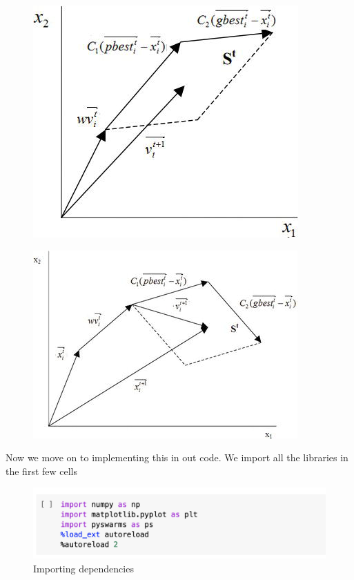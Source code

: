 \documentclass[12pt]{article}
\newcommand{\nd}{\noindent}
\begin{document}
\hspace{-5mm}
\begin{figure}[h]
\centering
\begin{minipage}{.5\textwidth}
  \centering
  \includegraphics[width=0.7\linewidth]{ps1.png}
  \label{fig:test1}
\end{minipage}%
\begin{minipage}{.5\textwidth}
  \centering
  \includegraphics[width=0.87\linewidth]{ps2.png}
  \label{fig:test2}
\end{minipage}
\end{figure}

\nd Now we move on to implementing this in out code. We import all the libraries in the first few cells 

\begin{center}
\begin{figure}[h]
\centerline{\includegraphics[scale=.6]{imp.png}}
\caption{Importing dependencies}
\end{figure}
\end{center}
\end{document}
